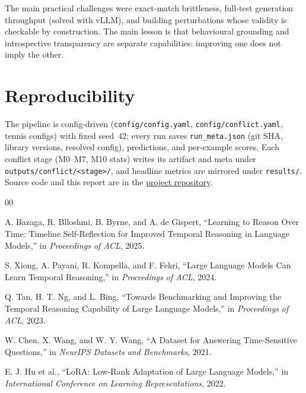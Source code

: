 \documentclass[conference]{IEEEtran}
\begin{document}
The main practical challenges were exact-match brittleness, full-test generation throughput (solved with vLLM), and building perturbations whose validity is checkable by construction. The main lesson is that behavioural grounding and introspective transparency are separate capabilities: improving one does not imply the other.

\section{Reproducibility}

The pipeline is config-driven (\texttt{config/config.yaml}, \texttt{config/conflict.yaml}, tennis configs) with fixed seed~42; every run saves \texttt{run\_meta.json} (git SHA, library versions, resolved config), predictions, and per-example scores. Each conflict stage (M0--M7, M10 stats) writes its artifact and meta under \texttt{outputs/conflict/<stage>/}, and headline metrics are mirrored under \texttt{results/}. Source code and this report are in the \href{https://github.com/thestbobo/tiser_temporal_reasoning_extension}{project repository}.

\begin{thebibliography}{00}

A. Bazaga, R. Blloshmi, B. Byrne, and A. de Gispert,
``Learning to Reason Over Time: Timeline Self-Reflection for Improved Temporal Reasoning in Language Models,''
in \emph{Proceedings of ACL}, 2025.

S. Xiong, A. Payani, R. Kompella, and F. Fekri,
``Large Language Models Can Learn Temporal Reasoning,''
in \emph{Proceedings of ACL}, 2024.

Q. Tan, H. T. Ng, and L. Bing,
``Towards Benchmarking and Improving the Temporal Reasoning Capability of Large Language Models,''
in \emph{Proceedings of ACL}, 2023.

W. Chen, X. Wang, and W. Y. Wang,
``A Dataset for Answering Time-Sensitive Questions,''
in \emph{NeurIPS Datasets and Benchmarks}, 2021.

E. J. Hu et al.,
``LoRA: Low-Rank Adaptation of Large Language Models,''
in \emph{International Conference on Learning Representations}, 2022.

\end{thebibliography}
\end{document}
